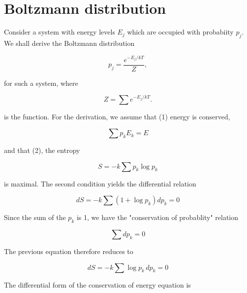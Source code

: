 

\section{Boltzmann distribution}

Consider a system with energy levels $E_j$ which
are occupied with probabiity $p_j$. We shall
derive the Boltzmann distribution

\begin{equation}
p_j= \frac{e^{-E_j/kT}}{Z},
\end{equation}

for such a system, where

\begin{equation}
Z = \sum e^{-  E_j/kT}.
\end{equation}

is the  function.
For the derivation, we assume that (1) energy is conserved,

\begin{equation}
\label{eq:conservedEnergy}
 \sum p_kE_k = E
\end{equation}

and that (2), the entropy

\begin{equation}
S = - k \sum p_k \log p_k
\end{equation}

is maximal.  The second condition yields the differential relation

\begin{equation}
dS = - k \sum (1 +\log p_k)  dp_k = 0
\end{equation}


Since the sum of the $p_k$ is 1, we have the "conservation of probablity" relation

\begin{equation}
\label{eq:consprob}
\sum dp_k = 0
\end{equation}

The previous equation therefore reduces to

\begin{equation}
\label{eq:diffEntropy}
 dS = -k \sum \log p_k\,  dp_k = 0
\end{equation}



The differential form of the conservation of energy equation is

